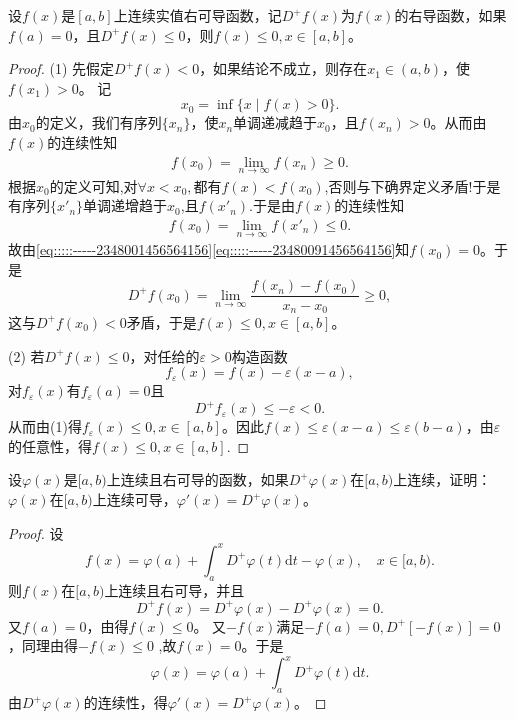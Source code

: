 \documentclass[../../main.tex]{subfiles}
\begin{document}
\begin{proposition}\label{proposition:右导数小于等于0函数值小于端点值}
设\( f(x) \)是\([a,b]\)上连续实值右可导函数，记\( D^+f(x) \)为\( f(x) \)的右导函数，如果\( f(a)=0 \)，且\( D^+f(x) \leqslant0 \)，则\( f(x) \leqslant0, x \in [a,b] \)。
\end{proposition}
\begin{proof}
(1) 先假定\( D^+f(x) < 0 \)，如果结论不成立，则存在\( x_1 \in (a,b) \)，使\( f(x_1) > 0 \)。
记
\[
x_0 = \inf\{ x \mid f(x) > 0 \}.
\]
由\( x_0 \)的定义，我们有序列\(\{ x_n \}\)，使\( x_n \)单调递减趋于\( x_0 \)，且\( f(x_n) > 0 \)。从而由\( f(x) \)的连续性知
\begin{align}
f\left( x_0 \right)=\underset{n\rightarrow \infty}{\lim}f\left( x_n \right) \geqslant 0.\label{eq:::::-----2348001456564156}
\end{align}
根据$x_0$的定义可知,对$\forall x<x_0,$都有$f(x)<f(x_0)$,否则与下确界定义矛盾!于是有序列$\{x'_n\}$单调递增趋于$x_0$,且$f(x'_n).$于是由\( f(x) \)的连续性知
\begin{align}
f\left( x_0 \right)=\underset{n\rightarrow \infty}{\lim}f\left( x'_n \right)  \leqslant 0.\label{eq:::::-----23480091456564156}
\end{align}
故由\eqref{eq:::::-----2348001456564156}\eqref{eq:::::-----23480091456564156}知\( f(x_0)=0 \)。于是
\[
D^+f(x_0) = \lim_{n \to \infty} \frac{f(x_n) - f(x_0)}{x_n - x_0} \geqslant 0,
\]
这与\( D^+f(x_0) < 0 \)矛盾，于是\( f(x) \leqslant 0, x \in [a,b] \)。

(2) 若\( D^+f(x) \leqslant 0 \)，对任给的\( \varepsilon > 0 \)构造函数
\[
f_\varepsilon(x) = f(x) - \varepsilon(x - a),
\]
对\( f_\varepsilon(x) \)有\( f_\varepsilon(a)=0 \)且
\[
D^+f_\varepsilon(x) \leqslant-\varepsilon < 0.
\]
从而由(1)得\( f_\varepsilon(x) \leqslant0, x \in [a,b] \)。因此\( f(x) \leqslant\varepsilon(x - a)\leqslant \varepsilon (b-a) \)，由\( \varepsilon \)的任意性，得\( f(x) \leqslant0, x \in [a,b] \).
\end{proof}

\begin{example}
设\( \varphi(x) \)是\([a,b)\)上连续且右可导的函数，如果\( D^+\varphi(x) \)在\([a,b)\)上连续，证明：\( \varphi(x) \)在\([a,b)\)上连续可导，\( \varphi'(x)=D^+\varphi(x) \)。
\end{example}
\begin{proof}
设
\[
f(x) = \varphi(a) + \int_a^x D^+\varphi(t)\mathrm{d}t - \varphi(x), \quad x \in [a,b).
\]
则\( f(x) \)在\([a,b)\)上连续且右可导，并且
\[
D^+f(x) = D^+\varphi(x) - D^+\varphi(x) = 0.
\]
又\( f(a)=0 \)，由得\( f(x) \leqslant0 \)。
又\(-f(x)\)满足\(-f(a)=0, D^+[-f(x)] = 0\)，同理由得\(-f(x) \leqslant0\) ,故\(f(x)=0\)。于是
\[
\varphi(x) = \varphi(a) + \int_a^x D^+\varphi(t)\mathrm{d}t.
\]
由\( D^+\varphi(x) \)的连续性，得\( \varphi'(x)=D^+\varphi(x) \)。
\end{proof}
\end{document}
